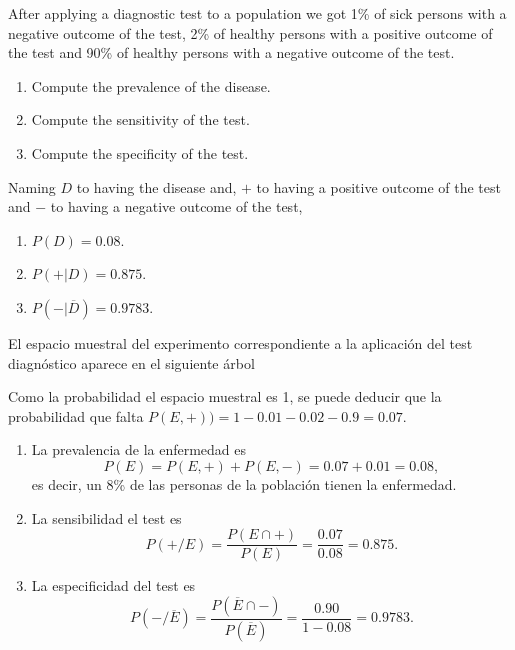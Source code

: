 {After applying a diagnostic test to a population we got 1\% of sick persons with a negative outcome of the test, 2\% of healthy persons with a positive outcome of the test and 90\% of healthy persons with a negative outcome of the test.  
\begin{enumerate}
\item Compute the prevalence of the disease.
\item Compute the sensitivity of the test.
\item Compute the specificity of the test.
\end{enumerate} 
} 
{Naming $D$ to having the disease and, $+$ to having a positive outcome of the test and $-$ to having a negative outcome of the test,
\begin{enumerate}
\item $P(D)=0.08$.
\item $P(+|D) = 0.875$.
\item $P(-|\overline{D})= 0.9783$.
\end{enumerate}
}
{El espacio muestral del experimento correspondiente a la aplicación del test diagnóstico aparece en el siguiente árbol
\begin{center}
\renewcommand{\psedge}[2]{\ncdiag[armA=0.8cm,angleA=180,angleB=0,armB=0cm]{#2}{#1}} 
\end{center}

Como la probabilidad el espacio muestral es 1, se puede deducir que la probabilidad que falta $P(E,+))= 1- 0.01 -0.02 -0.9 = 0.07$.

\begin{enumerate}
\item La prevalencia de la enfermedad es 
\[
P(E) = P(E,+)+P(E,-) = 0.07 + 0.01 = 0.08,
\]
es decir, un 8\% de las personas de la población tienen la enfermedad.

\item La sensibilidad el test es
\[
P(+/E) = \frac{P(E\cap +)}{P(E)} = \frac{0.07}{0.08} = 0.875.
\]

\item La especificidad del test es 
\[
P(-/\overline{E}) = \frac{P(\overline E\cap -)}{P(\overline E)} = \frac{0.90}{1-0.08} = 0.9783.
\]
\end{enumerate}
}



